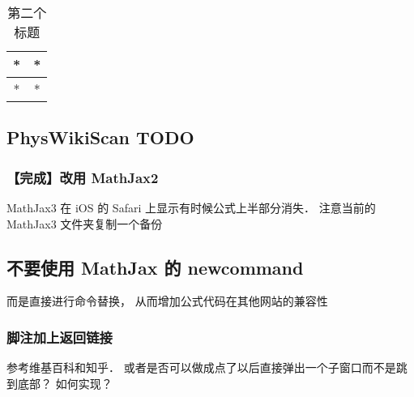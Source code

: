 \begin{table}[ht]
\centering
\caption{第二个标题}\label{edTODO_tab3}
\begin{tabular}{|c|c|}
\hline
* & * \\
\hline
* & * \\
\hline
\end{tabular}
\end{table}

\subsection{PhysWikiScan TODO}

\subsubsection{【完成】改用 MathJax2}
MathJax3 在 iOS 的 Safari 上显示有时候公式上半部分消失． 注意当前的 MathJax3 文件夹复制一个备份

\subsection{不要使用 MathJax 的 newcommand}
而是直接进行命令替换， 从而增加公式代码在其他网站的兼容性

\subsubsection{脚注加上返回链接}
参考维基百科和知乎． 或者是否可以做成点了以后直接弹出一个子窗口而不是跳到底部？ 如何实现？
